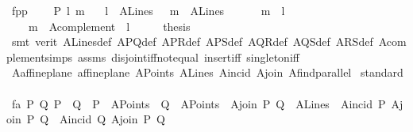 \begin{isabellebody}
%
\endisatagproof
{\isafoldproof}%
%
\isadelimproof
\isanewline
%
\endisadelimproof
\isanewline
{}\isamarkupfalse%
\ fpp{\isacharcolon}{\kern0pt}\ \isanewline
\ \ \ P\ l\ m\isanewline
\ \ \ {\isachardoublequoteopen}l\ {\isasymin}\ A{}Lines{\isachardoublequoteclose}\ \ \ {\isachardoublequoteopen}m\ {\isasymin}\ A{}Lines{\isachardoublequoteclose}\isanewline
\ \ \ \ \ \ {\isachardoublequoteopen}m\ {\isasyminter}\ l\ {\isacharequal}{\kern0pt}\ {\isacharbraceleft}{\kern0pt}{\isacharbraceright}{\kern0pt}{\isachardoublequoteclose}\ \isanewline
\ \ \ \ {\isachardoublequoteopen}m\ {\isacharequal}{\kern0pt}\ A{}complement\ \ l{\isachardoublequoteclose}\isanewline
%
\isadelimproof
%
\endisadelimproof
%
\isatagproof
{}\isamarkupfalse%
\ {\isacharminus}{\kern0pt}\isanewline
\ \ \isamarkupfalse%
\ {\isacharquery}{\kern0pt}thesis\ \isanewline
\ \ \isamarkupfalse%
\ {\isacharparenleft}{\kern0pt}smt\ {\isacharparenleft}{\kern0pt}verit{\isacharparenright}{\kern0pt}\ A{}Lines{\isacharunderscore}{\kern0pt}def\ A{}PQ{\isacharunderscore}{\kern0pt}def\ A{}PR{\isacharunderscore}{\kern0pt}def\ A{}PS{\isacharunderscore}{\kern0pt}def\ A{}QR{\isacharunderscore}{\kern0pt}def\ A{}QS{\isacharunderscore}{\kern0pt}def\ A{}RS{\isacharunderscore}{\kern0pt}def\ A{}complement{\isachardot}{\kern0pt}simps\ assms\ disjoint{\isacharunderscore}{\kern0pt}iff{\isacharunderscore}{\kern0pt}not{\isacharunderscore}{\kern0pt}equal\ insert{\isacharunderscore}{\kern0pt}iff\ singleton{\isacharunderscore}{\kern0pt}iff{\isacharparenright}{\kern0pt}\isanewline
{}\isamarkupfalse%
%
\endisatagproof
{\isafoldproof}%
%
\isadelimproof
\isanewline
%
\endisadelimproof
\isanewline
{}\isamarkupfalse%
\ A{}affine{\isacharunderscore}{\kern0pt}plane{\isacharcolon}{\kern0pt}\ {\isachardoublequoteopen}affine{\isacharunderscore}{\kern0pt}plane\ A{}Points\ A{}Lines\ A{}incid\ A{}join\ A{}find{\isacharunderscore}{\kern0pt}parallel{\isachardoublequoteclose}\isanewline
%
\isadelimproof
%
\endisadelimproof
%
\isatagproof
{}\isamarkupfalse%
\ standard\isanewline
\ \ \isamarkupfalse%
\ f{}a{\isacharcolon}{\kern0pt}\ {\isachardoublequoteopen}{\isasymAnd}P\ Q{\isachardot}{\kern0pt}\ P\ {\isasymnoteq}\ Q\ {\isasymLongrightarrow}\ P\ {\isasymin}\ A{}Points\ {\isasymLongrightarrow}\ Q\ {\isasymin}\ A{}Points\ {\isasymLongrightarrow}\ A{}join\ P\ Q\ {\isasymin}\ A{}Lines\ {\isasymand}\ A{}incid\ P\ {\isacharparenleft}{\kern0pt}A{}join\ P\ Q{\isacharparenright}{\kern0pt}\ {\isasymand}\ A{}incid\ Q\ {\isacharparenleft}{\kern0pt}A{}join\ P\ Q{\isacharparenright}{\kern0pt}{\isachardoublequoteclose}\ \isanewline

\end{isabellebody}
